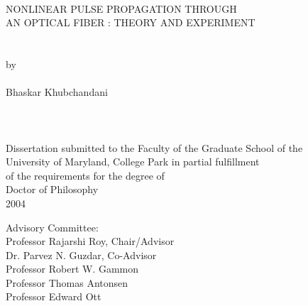 
\thispagestyle{empty}
\hbox{\ }
\vspace{1in}
\renewcommand{\baselinestretch}{1}
\small\normalsize
\begin{center}

\large{{NONLINEAR PULSE PROPAGATION THROUGH \\
AN OPTICAL FIBER : THEORY AND EXPERIMENT}}\\
\ \\
\ \\
\large{by} \\
\ \\
\large{Bhaskar Khubchandani}%
\ \\
\ \\
\ \\
\ \\
\normalsize
Dissertation submitted to the Faculty of the Graduate School of the \\
University of Maryland, College Park in partial fulfillment \\
of the requirements for the degree of \\
Doctor of Philosophy \\
2004
\end{center}

\vspace{7.5em}

\noindent Advisory Committee: \\
Professor Rajarshi Roy, Chair/Advisor \\
Dr. Parvez N. Guzdar, Co-Advisor \\
Professor Robert W. Gammon \\
Professor Thomas Antonsen \\
Professor Edward Ott
